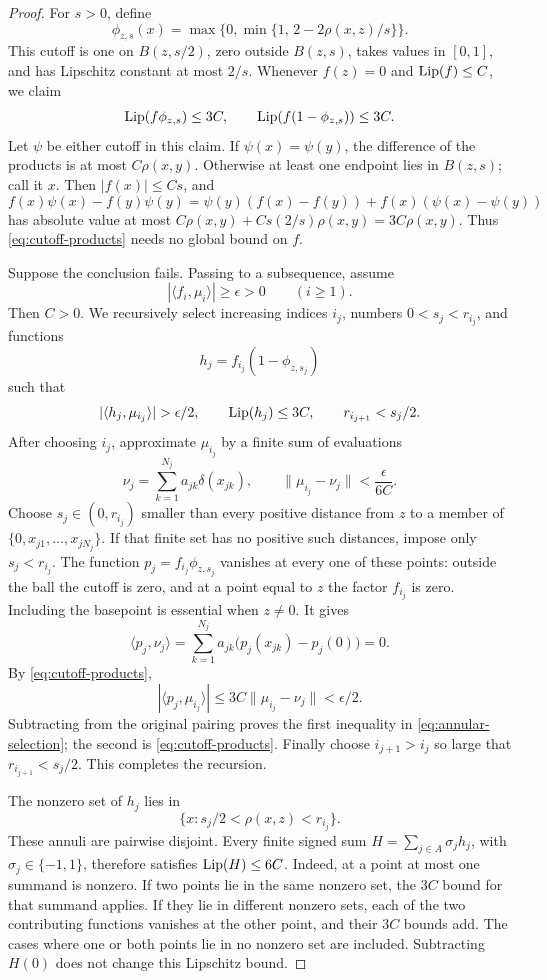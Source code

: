 \begin{proof}
For \(s>0\), define
\[
 \phi_{z,s}(x)=\max\{0,\min\{1,\,2-2\rho(x,z)/s\}\}.
\]
This cutoff is one on \(B(z,s/2)\), zero outside \(B(z,s)\), takes
values in \([0,1]\), and has Lipschitz constant at most \(2/s\).
Whenever \(f(z)=0\) and \(\operatorname{Lip}(f)\le C\), we claim
\begin{equation}
\label{eq:cutoff-products}
 \operatorname{Lip}(f\phi_{z,s})\le3C,\qquad
 \operatorname{Lip}(f(1-\phi_{z,s}))\le3C.
\end{equation}
Let \(\psi\) be either cutoff in this claim. If
\(\psi(x)=\psi(y)\), the difference of the products is at most
\(C\rho(x,y)\). Otherwise at least one endpoint lies in \(B(z,s)\);
call it \(x\). Then \(|f(x)|\le Cs\), and
\[
 f(x)\psi(x)-f(y)\psi(y)
 =\psi(y)(f(x)-f(y))+f(x)(\psi(x)-\psi(y))
\]
has absolute value at most
\(C\rho(x,y)+Cs(2/s)\rho(x,y)=3C\rho(x,y)\).
Thus \eqref{eq:cutoff-products} needs no global bound on \(f\).

Suppose the conclusion fails. Passing to a subsequence, assume
\[
 |\langle f_i,\mu_i\rangle|\ge\epsilon>0\qquad(i\ge1).
\]
Then \(C>0\). We recursively select increasing indices \(i_j\),
numbers \(0<s_j<r_{i_j}\), and functions
\[
 h_j=f_{i_j}(1-\phi_{z,s_j})
\]
such that
\begin{equation}
\label{eq:annular-selection}
 |\langle h_j,\mu_{i_j}\rangle|>\epsilon/2,\qquad
 \Lip(h_j)\le3C,\qquad r_{i_{j+1}}<s_j/2.
\end{equation}
After choosing \(i_j\), approximate \(\mu_{i_j}\) by a finite sum of
evaluations
\[
 \nu_j=\sum_{k=1}^{N_j}a_{jk}\delta(x_{jk}),\qquad
 \|\mu_{i_j}-\nu_j\|<\frac{\epsilon}{6C}.
\]
Choose \(s_j\in(0,r_{i_j})\) smaller than every positive distance
from \(z\) to a member of
\(\{0,x_{j1},\ldots,x_{jN_j}\}\). If that finite set has no positive
such distances, impose only \(s_j<r_{i_j}\).
The function \(p_j=f_{i_j}\phi_{z,s_j}\) vanishes at every one of
these points: outside the ball the cutoff is zero, and at a point
equal to \(z\) the factor \(f_{i_j}\) is zero. Including the
basepoint is essential when \(z\ne0\). It gives
\[
 \langle p_j,\nu_j\rangle
 =\sum_{k=1}^{N_j}a_{jk}\bigl(p_j(x_{jk})-p_j(0)\bigr)=0.
\]
By \eqref{eq:cutoff-products},
\[
 |\langle p_j,\mu_{i_j}\rangle|
 \le3C\|\mu_{i_j}-\nu_j\|<\epsilon/2.
\]
Subtracting from the original pairing proves the first inequality in
\eqref{eq:annular-selection}; the second is
\eqref{eq:cutoff-products}. Finally choose \(i_{j+1}>i_j\) so large
that \(r_{i_{j+1}}<s_j/2\). This completes the recursion.

The nonzero set of \(h_j\) lies in
\[
 \{x:s_j/2<\rho(x,z)<r_{i_j}\}.
\]
These annuli are pairwise disjoint. Every finite signed sum
\(H=\sum_{j\in A}\sigma_jh_j\), with \(\sigma_j\in\{-1,1\}\),
therefore satisfies \(\operatorname{Lip}(H)\le6C\). Indeed, at a point at most
one summand is nonzero. If two points lie in the same nonzero set,
the \(3C\) bound for that summand applies. If they lie in different
nonzero sets, each of the two contributing functions vanishes at the
other point, and their \(3C\) bounds add. The cases where one or both
points lie in no nonzero set are included. Subtracting \(H(0)\)
does not change this Lipschitz bound.


\end{proof}
